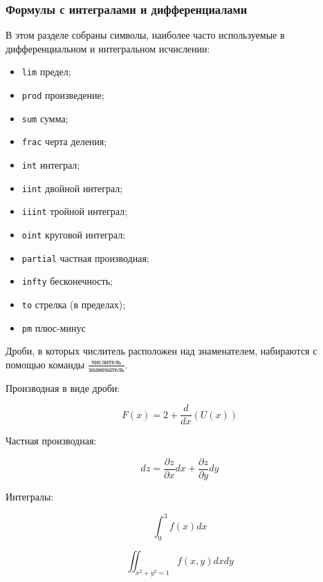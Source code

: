 \documentclass[
  a4paper,
]{book}
\providecommand{\tightlist}{%
  \setlength{\itemsep}{0pt}\setlength{\parskip}{0pt}}
\theoremstyle{definition}
\theoremstyle{definition}
\theoremstyle{definition}
\theoremstyle{definition}
\theoremstyle{remark}
\begin{document}
\hypertarget{markdown-syntax-math-syms}{%
\subsubsection{Формулы с интегралами и дифференциалами}\label{markdown-syntax-math-syms}}

В этом разделе собраны символы, наиболее часто используемые в дифференциальном и интегральном исчислении:

\begin{itemize}
\tightlist
\item
  \texttt{lim} предел;
\item
  \texttt{prod} произведение;
\item
  \texttt{sum} сумма;
\item
  \texttt{frac} черта деления;
\item
  \texttt{int} интеграл;
\item
  \texttt{iint} двойной интеграл;
\item
  \texttt{iiint} тройной интеграл;
\item
  \texttt{oint} круговой интеграл;
\item
  \texttt{partial} частная производная;
\item
  \texttt{infty} бесконечность;
\item
  \texttt{to} стрелка (в пределах);
\item
  \texttt{pm} плюс-минус
\end{itemize}

Дроби, в которых числитель расположен над знаменателем, набираются с помощью команды \(\frac{числитель}{знаменатель}\).

Производная в виде дроби:

\begin{equation}
F(x) = 2+\frac{d}{dx}(U(x))
\end{equation}

Частная производная:

\begin{equation}
dz = \frac{\partial z}{\partial x} dx + \frac{\partial z}{\partial y} dy
\end{equation}

Интегралы:

\begin{equation}
\int_{0}^{3} f(x) dx
\end{equation}

\begin{equation}
\iint_{x^2 + y^2 = 1} f(x, y) dx dy
\end{equation}
\end{document}
